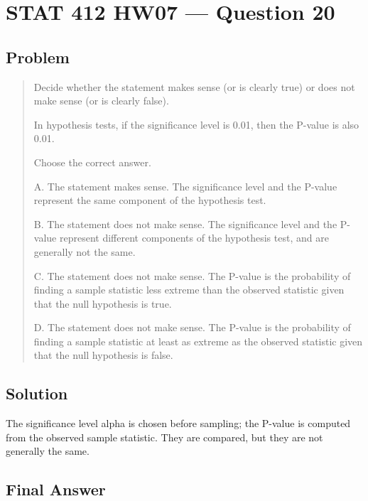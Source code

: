 \documentclass[11pt]{article}
\begin{document}
\section*{STAT 412 HW07 --- Question 20}

\subsection*{Problem}

\begin{quote}
Decide whether the statement makes sense (or is clearly true) or does not make sense (or is clearly false).

In hypothesis tests, if the significance level is 0.01, then the P-value is also 0.01.

Choose the correct answer.

A. The statement makes sense. The significance level and the P-value represent the same component of the hypothesis test.

B. The statement does not make sense. The significance level and the P-value represent different components of the hypothesis test, and are generally not the same.

C. The statement does not make sense. The P-value is the probability of finding a sample statistic less extreme than the observed statistic given that the null hypothesis is true.

D. The statement does not make sense. The P-value is the probability of finding a sample statistic at least as extreme as the observed statistic given that the null hypothesis is false.
\end{quote}

\subsection*{Solution}

The significance level alpha is chosen before sampling; the P-value is computed from the observed sample statistic. They are compared, but they are not generally the same.

\subsection*{Final Answer}

\end{document}
